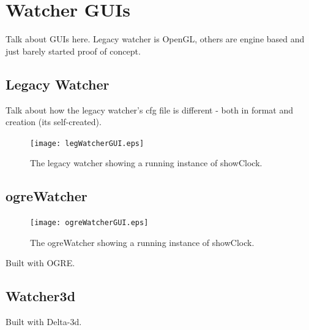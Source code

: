 \documentclass{article}
\begin{document}


\section{Watcher GUIs}

Talk about GUIs here. Legacy watcher is OpenGL, others are engine based and just barely started proof of concept.

\subsection{Legacy Watcher}

Talk about how the legacy watcher's cfg file is different - both in format and creation (its self-created). 

\label{LegacyWatcher}
\begin{figure}[htb]
\centering
\texttt{[image: legWatcherGUI.eps]}
\caption{The legacy watcher showing a running instance of showClock.}
\label{fig:LegacyWatcherClock}
\end{figure}

\subsection{ogreWatcher}
\begin{figure}
\centering
\texttt{[image: ogreWatcherGUI.eps]}
\caption{The ogreWatcher showing a running instance of showClock.}
\label{ogreWatcher}
\end{figure}

Built with OGRE.
\subsection{Watcher3d}
Built with Delta-3d.

\printindex
\end{document}
